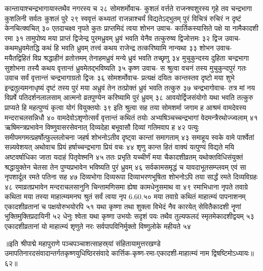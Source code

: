 कान्तायाश्चन्द्रभागायास्तथैव नगरस्य च २८
सोमशर्मोवाच-
कुशलं वर्त्तते राजन्श्वशुरस्य गृहे तव 
चन्द्रभागा कुशलिनी सर्वतः कुशलं पुरे २९
स्ववृत्तं कथ्यतां राजन्नाश्चर्यं विद्यतेऽद्भुतम् 
पुरं विचित्रं रुचिरं न दृष्टं केनचित्क्वचित् ३०
एतदाचक्ष्व नृपते कुतः प्राप्तमिदं त्वया 
शोभन उवाच-
कार्तिकस्यासिते पक्षे या नामैकादशी रमा ३१
तामुपोष्य मया प्राप्तं द्विजेन्द्र पुरमध्रुवम् 
ध्रुवं भवति येनैव तत्कुरुष्व द्विजोत्तमः ३२
द्विज उवाच-
कथमध्रुवमेतद्धि कथं हि भवति ध्रुवम् 
तत्त्वं कथय राजेन्द्र तत्करिष्यामि नान्यथा ३३
शोभन उवाच-
मयैतद्विहितं विप्र श्रद्धाहीनं व्रतोत्तमम् 
तेनाहमध्रुवं मन्ये ध्रुवं भवति तच्छृणु ३४
मुचुकुन्दस्य दुहिता चन्द्रभागा सुशोभना 
तस्यै कथय वृत्तान्तं ध्रुवमेतद्भविष्यति ३५
कृष्ण उवाच-
स श्रुत्वा वचनं तस्य मुचुकुन्दपुरं गतः 
उवाच सर्वं वृत्तान्त्तं चन्द्रभागाग्रतो द्विजः ३६
सोमशर्मोवाच-
प्रत्यक्षं दयितः कान्तस्तव दृष्टो मया शुभे 
इन्द्रतुल्यमनाधृष्यं दृष्टं तस्य पुरं मया 
अध्रुवं तेन तत्प्रोक्तं ध्रुवं भवति तत्कुरु ३७
चन्द्रभागोवाच-
तत्र मां नय विप्रर्षे पतिदर्शनलालसाम् 
आत्मनो व्रतपुण्येन करिष्यामि पुरं ध्रुवम् ३८
आवयोर्द्विजसंयोगो यथा भवति तत्कुरु 
प्राप्यते हि महत्पुण्यं कृत्वा योगं वियुक्तयोः ३९
इति श्रुत्वा सह तया सोमशर्मा जगाम ह 
आश्रमं वामदेवस्य मन्दराचलसन्निधौ ४०
वामदेवोऽशृणोत्सर्वं वृत्तान्तं कथितं तयोः 
अभ्यषिञ्चच्चन्द्रभागां वेदमन्त्रैरथोज्ज्वलाम् ४१
ऋषिमन्त्रप्रभावेन विष्णुवासरसेवनात् 
दिव्यदेहा बभूवासौ दिव्यां गतिमवाप ह ४२
पत्युः समीपमगमत्प्रहर्षोत्फुल्ललोचना 
जहर्ष शोभनोऽतीव दृष्ट्वा कान्तां समागताम् ४३
समाहूय स्वके वामे पार्श्वेतां सन्न्यवेशयत् 
अथोवाच प्रियं हर्षाच्चन्द्रभागा प्रियं वचः ४४
शृणु कान्त हितं वाक्यं यत्पुण्यं विद्यते मयि 
अष्टवर्षाधिका जाता यदाहं पितृवेश्मनि ४५
ततः प्रभृति यच्चीर्णं मया चैकादशीव्रतम् 
यथोक्तविधिसंयुक्तं श्रद्धायुक्तेन चेतसा 
तेन पुण्यप्रभावेन भविष्यति पुरं ध्रुवम् ४६
सर्वकामसमृद्धं च यावदाभूतसम्प्लवम् 
एवं सा नृपशार्दूल रमते पतिना सह ४७
दिव्यभोगा दिव्यरूपा दिव्याभरणभूषिता 
शोभनोऽपि तया सार्द्धं रमते दिव्यविग्रहः ४८
रमाव्रतप्रभावेन मन्दराचलसानुनि 
चिन्तामणिसमा ह्येषा कामधेनुसमाथ वा ४९
रमाभिधाना नृपते तवाग्रे कथिता मया 
तस्या माहात्म्यमनघ श्रुतं सर्वं त्वया नृप 6.60.५०
मया तवाग्रे कथितं माहात्म्यं पापनाशनम् 
एकादशीव्रतानां च पक्षयोरुभयोरपि ५१
यथा कृष्णा तथा शुक्ला विभेदं नैव कारयेत् 
सेवितैकादशी नॄणां भुक्तिमुक्तिप्रदायिनी ५२
धेनुः श्वेता यथा कृष्णा उभयोः सदृशं पयः 
तथैव तुल्यफलदं स्मृतमेकादशीद्वयम् ५३
एकादशीव्रतानां यो माहात्म्यं शृणुते नरः 
सर्वपापविनिर्मुक्तो विष्णुलोके महीयते ५४

॥इति श्रीपाद्मे महापुराणे पञ्चपञ्चाशत्साहस्र्यां संहितायामुत्तरखण्डे उमापतिनारदसंवादान्तर्गतकृष्णयुधिष्ठिरसंवादे कार्त्तिक-कृष्ण-रमा-एकादशी-माहात्म्यं नाम द्विषष्टिमोऽध्यायः॥६२॥


